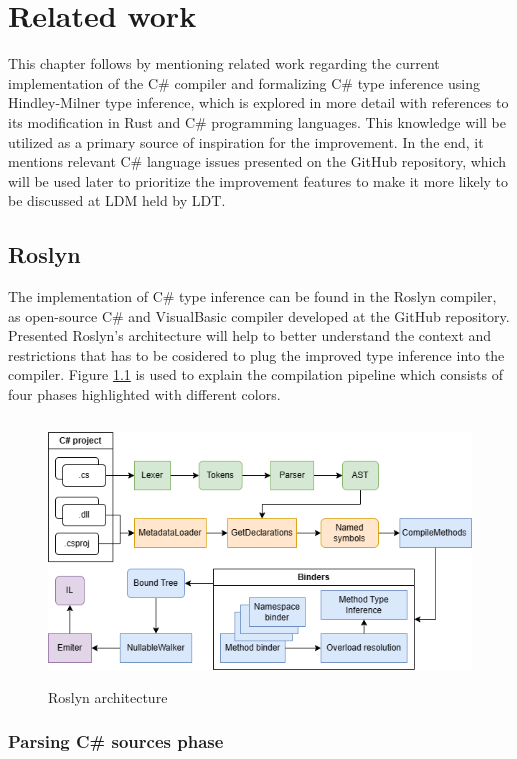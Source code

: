 \chapter{Related work}

This chapter follows by mentioning related work regarding the current implementation of the C\# compiler and formalizing C\# type inference using Hindley-Milner type inference, which is explored in more detail with references to its modification in Rust and C\# programming languages.
This knowledge will be utilized as a primary source of inspiration for the improvement.
In the end, it mentions relevant C\# language issues presented on the GitHub repository, which will be used later to prioritize the improvement features to make it more likely to be discussed at \ac{LDM} held by \ac{LDT}. 

\section{Roslyn}

The implementation of C\# type inference can be found in the Roslyn compiler, as open-source C\# and VisualBasic compiler developed at the GitHub repository. 
Presented Roslyn’s architecture will help to better understand the context and restrictions that has to be cosidered to plug the improved type inference into the compiler.
Figure \ref{img15:roslynPip} is used to explain the compilation pipeline \cite{online:roslynArchitecture} which consists of four phases highlighted with different colors.
\begin{figure}[h]
\centering
\includegraphics[width=120mm, height=70mm]{./img/Roslyn_Arch.png}
\caption{Roslyn architecture}
\label{img15:roslynPip}
\end{figure}

\subsection{Parsing C\# sources phase}

